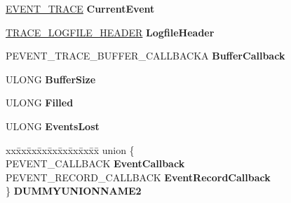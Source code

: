 \begin{DoxyCompactItemize}
\begin{tabbing}
\end{tabbing}\item 
\mbox{\label{struct___e_v_e_n_t___t_r_a_c_e___l_o_g_f_i_l_e_a_a33c0824d5117481b3b38f03ec9d37622}} 
\hyperlink{struct___e_v_e_n_t___t_r_a_c_e}{E\+V\+E\+N\+T\+\_\+\+T\+R\+A\+CE} {\bfseries Current\+Event}
\item 
\mbox{\label{struct___e_v_e_n_t___t_r_a_c_e___l_o_g_f_i_l_e_a_a52fd5450dd22daff51fc76f5150b115d}} 
\hyperlink{struct___t_r_a_c_e___l_o_g_f_i_l_e___h_e_a_d_e_r}{T\+R\+A\+C\+E\+\_\+\+L\+O\+G\+F\+I\+L\+E\+\_\+\+H\+E\+A\+D\+ER} {\bfseries Logfile\+Header}
\item 
\mbox{\label{struct___e_v_e_n_t___t_r_a_c_e___l_o_g_f_i_l_e_a_a4a97a5f037e6e6d522284fc6e42f2064}} 
P\+E\+V\+E\+N\+T\+\_\+\+T\+R\+A\+C\+E\+\_\+\+B\+U\+F\+F\+E\+R\+\_\+\+C\+A\+L\+L\+B\+A\+C\+KA {\bfseries Buffer\+Callback}
\item 
\mbox{\label{struct___e_v_e_n_t___t_r_a_c_e___l_o_g_f_i_l_e_a_af5e4677fc5b33d454cbfe83a111eece0}} 
U\+L\+O\+NG {\bfseries Buffer\+Size}
\item 
\mbox{\label{struct___e_v_e_n_t___t_r_a_c_e___l_o_g_f_i_l_e_a_a1ce5a1a8bd7ca3cb3508bc1decc42000}} 
U\+L\+O\+NG {\bfseries Filled}
\item 
\mbox{\label{struct___e_v_e_n_t___t_r_a_c_e___l_o_g_f_i_l_e_a_afda2073887765a2dc786940f3bef8881}} 
U\+L\+O\+NG {\bfseries Events\+Lost}
\item 
\mbox{\label{struct___e_v_e_n_t___t_r_a_c_e___l_o_g_f_i_l_e_a_a01e2428eb01aab8f786c6e835162f963}} 
\begin{tabbing}
xx\=xx\=xx\=xx\=xx\=xx\=xx\=xx\=xx\=\kill
union \{\\
\>PEVENT\_CALLBACK {\bfseries EventCallback}\\
\>PEVENT\_RECORD\_CALLBACK {\bfseries EventRecordCallback}\\
\} {\bfseries DUMMYUNIONNAME2}\\


\end{tabbing}
\end{DoxyCompactItemize}
